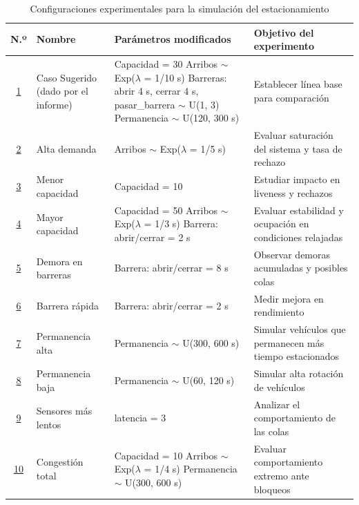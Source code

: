 \documentclass[12pt]{article}
\begin{document}
\begin{table}[H]
\centering
\begin{tabular}{|c|p{3.5cm}|p{6cm}|p{4.5cm}|}
\hline
\textbf{N.º} & \textbf{Nombre} & \textbf{Parámetros modificados} & \textbf{Objetivo del experimento} \\

\hline
\hyperlink{exp1}{1} & Caso Sugerido (dado por el informe) &
Capacidad = 30 \newline
Arribos $\sim$ Exp($\lambda$ = 1/10 s) \newline
Barreras: abrir 4 s, cerrar 4 s, pasar\_barrera $\sim$ U(1, 3) \newline
Permanencia $\sim$ U(120, 300 s) &
Establecer línea base para comparación \\

\hline
\hyperlink{exp2}{2} & Alta demanda &
Arribos $\sim$ Exp($\lambda$ = 1/5 s) &
Evaluar saturación del sistema y tasa de rechazo \\

\hline
\hyperlink{exp3}{3} & Menor capacidad &
Capacidad = 10 &
Estudiar impacto en liveness y rechazos \\

\hline
\hyperlink{exp4}{4} & Mayor capacidad &
Capacidad = 50 \newline
Arribos $\sim$ Exp($\lambda$ = 1/3 s) \newline
Barrera: abrir/cerrar = 2 s &
Evaluar estabilidad y ocupación en condiciones relajadas \\

\hline
\hyperlink{exp5}{5} & Demora en barreras &
Barrera: abrir/cerrar = 8 s &
Observar demoras acumuladas y posibles colas \\

\hline
\hyperlink{exp6}{6} & Barrera rápida &
Barrera: abrir/cerrar = 2 s &
Medir mejora en rendimiento \\

\hline
\hyperlink{exp7}{7} & Permanencia alta &
Permanencia $\sim$ U(300, 600 s) &
Simular vehículos que permanecen más tiempo estacionados \\

\hline
\hyperlink{exp8}{8} & Permanencia baja &
Permanencia $\sim$ U(60, 120 s) &
Simular alta rotación de vehículos \\

\hline
\hyperlink{exp9}{9} & Sensores más lentos &
latencia = 3 &
Analizar el comportamiento de las colas \\

\hline
\hyperlink{exp10}{10} & Congestión total &
Capacidad = 10 \newline
Arribos $\sim$ Exp($\lambda$ = 1/4 s) \newline
Permanencia $\sim$ U(300, 600 s) &
Evaluar comportamiento extremo ante bloqueos \\

\hline
\end{tabular}
\caption{Configuraciones experimentales para la simulación del estacionamiento}
\end{table}
\end{document}
